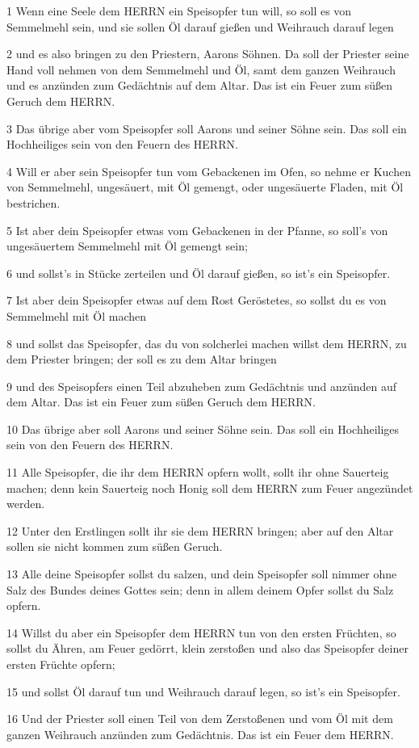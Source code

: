 \par 1 Wenn eine Seele dem HERRN ein Speisopfer tun will, so soll es von Semmelmehl sein, und sie sollen Öl darauf gießen und Weihrauch darauf legen
\par 2 und es also bringen zu den Priestern, Aarons Söhnen. Da soll der Priester seine Hand voll nehmen von dem Semmelmehl und Öl, samt dem ganzen Weihrauch und es anzünden zum Gedächtnis auf dem Altar. Das ist ein Feuer zum süßen Geruch dem HERRN.
\par 3 Das übrige aber vom Speisopfer soll Aarons und seiner Söhne sein. Das soll ein Hochheiliges sein von den Feuern des HERRN.
\par 4 Will er aber sein Speisopfer tun vom Gebackenen im Ofen, so nehme er Kuchen von Semmelmehl, ungesäuert, mit Öl gemengt, oder ungesäuerte Fladen, mit Öl bestrichen.
\par 5 Ist aber dein Speisopfer etwas vom Gebackenen in der Pfanne, so soll's von ungesäuertem Semmelmehl mit Öl gemengt sein;
\par 6 und sollst's in Stücke zerteilen und Öl darauf gießen, so ist's ein Speisopfer.
\par 7 Ist aber dein Speisopfer etwas auf dem Rost Geröstetes, so sollst du es von Semmelmehl mit Öl machen
\par 8 und sollst das Speisopfer, das du von solcherlei machen willst dem HERRN, zu dem Priester bringen; der soll es zu dem Altar bringen
\par 9 und des Speisopfers einen Teil abzuheben zum Gedächtnis und anzünden auf dem Altar. Das ist ein Feuer zum süßen Geruch dem HERRN.
\par 10 Das übrige aber soll Aarons und seiner Söhne sein. Das soll ein Hochheiliges sein von den Feuern des HERRN.
\par 11 Alle Speisopfer, die ihr dem HERRN opfern wollt, sollt ihr ohne Sauerteig machen; denn kein Sauerteig noch Honig soll dem HERRN zum Feuer angezündet werden.
\par 12 Unter den Erstlingen sollt ihr sie dem HERRN bringen; aber auf den Altar sollen sie nicht kommen zum süßen Geruch.
\par 13 Alle deine Speisopfer sollst du salzen, und dein Speisopfer soll nimmer ohne Salz des Bundes deines Gottes sein; denn in allem deinem Opfer sollst du Salz opfern.
\par 14 Willst du aber ein Speisopfer dem HERRN tun von den ersten Früchten, so sollst du Ähren, am Feuer gedörrt, klein zerstoßen und also das Speisopfer deiner ersten Früchte opfern;
\par 15 und sollst Öl darauf tun und Weihrauch darauf legen, so ist's ein Speisopfer.
\par 16 Und der Priester soll einen Teil von dem Zerstoßenen und vom Öl mit dem ganzen Weihrauch anzünden zum Gedächtnis. Das ist ein Feuer dem HERRN.

